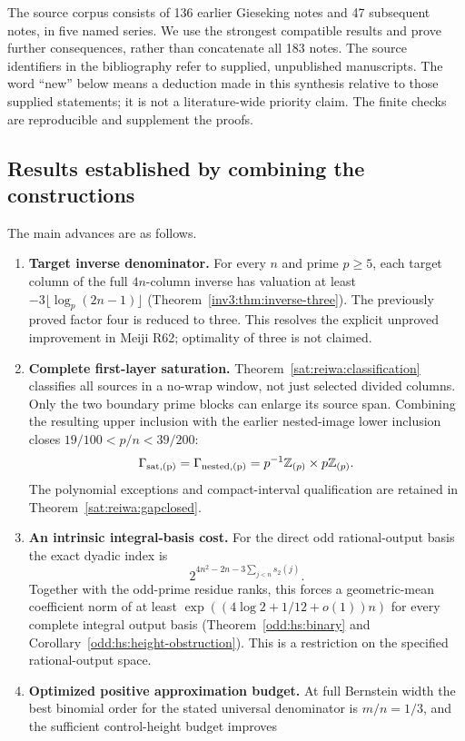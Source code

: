 \documentclass[11pt,a4paper]{article}
\numberwithin{equation}{section}
\theoremstyle{definition}\newtheorem{definition}[theorem]{Definition}
\theoremstyle{remark}\newtheorem{remark}[theorem]{Remark}
\begin{document}
The source corpus consists of 136 earlier Gieseking notes and 47 subsequent
notes, in five named series. We use the strongest compatible results and
prove further consequences, rather than concatenate all 183 notes.
The source identifiers in the bibliography refer to supplied, unpublished
manuscripts. The word ``new'' below means a deduction made in this synthesis
relative to those supplied statements; it is not a literature-wide priority
claim. The finite checks are reproducible and supplement the proofs.

\subsection{Results established by combining the constructions}
The main advances are as follows.
\begin{enumerate}
\item \textbf{Target inverse denominator.}
For every $n$ and prime $p\ge5$, each target column of the full $4n$-column
inverse has valuation at least $-3\lfloor\log_p(2n-1)\rfloor$
(Theorem~\ref{inv3:thm:inverse-three}). The previously proved factor four
is reduced to three. This resolves the explicit unproved improvement in
Meiji R62; optimality of three is not claimed.
\item \textbf{Complete first-layer saturation.}
Theorem~\ref{sat:reiwa:classification} classifies all sources in a no-wrap
window, not just selected divided columns. Only the two boundary prime
blocks can enlarge its source span. Combining the resulting upper inclusion
with the earlier nested-image lower inclusion closes
$19/100<p/n<39/200$:
\[
 \Gamma_{\rm sat,(p)}=\Gamma_{\rm nested,(p)}
       =p^{-1}\mathbb Z_{(p)}\times p\mathbb Z_{(p)}.
\]
The polynomial exceptions and compact-interval qualification are retained
in Theorem~\ref{sat:reiwa:gapclosed}.
\item \textbf{An intrinsic integral-basis cost.}
For the direct odd rational-output basis the exact dyadic index is
\[
 2^{4n^2-2n-3\sum_{j<n}s_2(j)}.
\]
Together with the odd-prime residue ranks, this forces a geometric-mean
coefficient norm of at least
$\exp((4\log2+1/12+o(1))n)$ for every complete integral output basis
(Theorem~\ref{odd:hs:binary} and Corollary~\ref{odd:hs:height-obstruction}).
This is a restriction on the specified rational-output space.
\item \textbf{Optimized positive approximation budget.}
At full Bernstein width the best binomial order for the stated universal
denominator is $m/n=1/3$, and the sufficient control-height budget improves

\end{enumerate}
\end{document}
